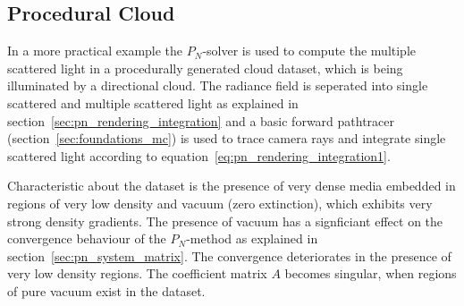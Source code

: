 \subsection{Procedural Cloud}
\label{sec:pn_results_clouds}

In a more practical example the $P_N$-solver is used to compute the multiple scattered light in a procedurally generated cloud dataset, which is being illuminated by a directional cloud. The radiance field is seperated into single scattered and multiple scattered light as explained in section~\ref{sec:pn_rendering_integration} and a basic forward pathtracer (section~\ref{sec:foundations_mc}) is used to trace camera rays and integrate single scattered light according to equation~\ref{eq:pn_rendering_integration1}.

Characteristic about the dataset is the presence of very dense media embedded in regions of very low density and vacuum (zero extinction), which exhibits very strong density gradients. The presence of vacuum has a signficiant effect on the convergence behaviour of the $P_N$-method as explained in section~\ref{sec:pn_system_matrix}. The convergence deteriorates in the presence of very low density regions. The coefficient matrix $A$ becomes singular, when regions of pure vacuum exist in the dataset.

